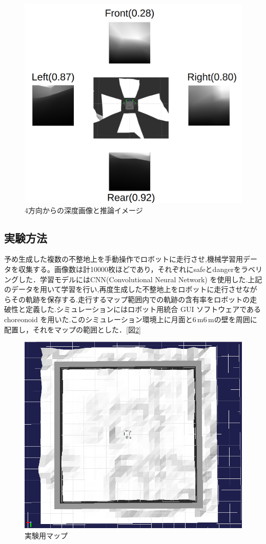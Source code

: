 \documentclass[uplatex,twocolumn, dvipdfmx]{jsarticle}  %
\begin{document}
\begin{figure}[t]
\begin{center}
  \includegraphics[width=0.6\linewidth]{images/planning.png}
  \caption{4方向からの深度画像と推論イメージ}
  \label{fig:planning}
\end{center}
\end{figure}

\subsection{実験方法}
予め生成した複数の不整地上を手動操作でロボットに走行させ,機械学習用データを収集する。画像数は計10000枚ほどであり，それぞれにsafeとdangerをラベリングした．学習モデルにはCNN(Convolutional Neural Network) を使用した.上記のデータを用いて学習を行い,再度生成した不整地上をロボットに走行させながらその軌跡を保存する.走行するマップ範囲内での軌跡の含有率をロボットの走破性と定義した.\cite{bunken2}シミュレーションにはロボット用統合 GUI ソフトウェアであるchoreonoid を用いた.このシミュレーション環境上に月面と$6 \mathrm{\,m}$\times$6\mathrm{\,m}$の壁を周囲に配置し，それをマップの範囲とした．[図\ref{fig:choreonoid}]

\begin{figure}[b]
  \begin{center}
   \includegraphics[width=0.5\linewidth]{images/choreonoid.png}
   \caption{実験用マップ}
   \label{fig:choreonoid}
  \end{center}
 \end{figure}
\end{document}
